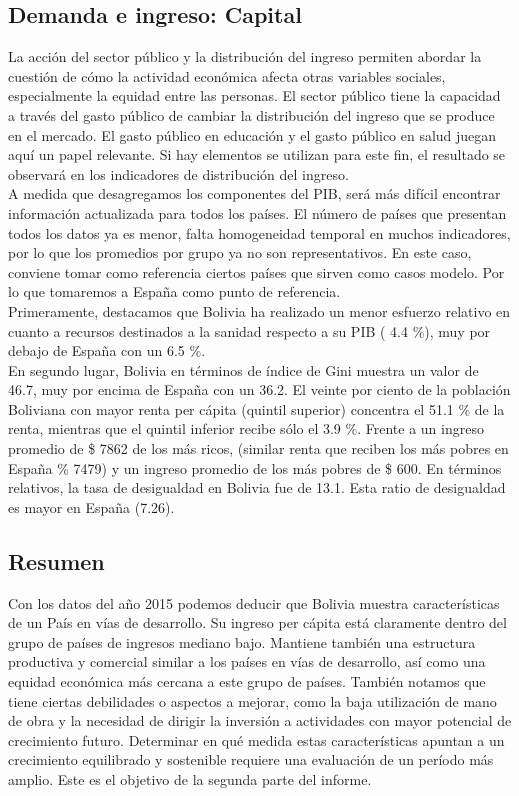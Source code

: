     \subsection{Demanda e ingreso: Capital}
    La acción del sector público y la distribución del ingreso permiten abordar la cuestión de cómo la actividad económica afecta otras variables sociales, especialmente la equidad entre las personas. El sector público tiene la capacidad a través del gasto público de cambiar la distribución del ingreso que se produce en el mercado. El gasto público en educación y el gasto público en salud juegan aquí un papel relevante. Si hay elementos se utilizan para este fin, el resultado se observará en los indicadores de distribución del ingreso.\\
    A medida que desagregamos los componentes del PIB, será más difícil encontrar información actualizada para todos los países. El número de países que presentan todos los datos ya es menor, falta homogeneidad temporal en muchos indicadores, por lo que los promedios por grupo ya no son representativos. En este caso, conviene tomar como referencia ciertos países que sirven como casos modelo. Por lo que tomaremos a España como punto de referencia.\\
    Primeramente, destacamos que Bolivia ha realizado un menor esfuerzo relativo en cuanto a recursos destinados a la sanidad respecto a su PIB ( 4.4 \%), muy por debajo de España con un 6.5 \%.\\
    En segundo lugar, Bolivia en términos de índice de Gini muestra un valor de 46.7, muy por encima de  España con un 36.2. El veinte por ciento de la población Boliviana con mayor renta per cápita (quintil superior) concentra el 51.1 \% de la renta, mientras que el quintil inferior recibe sólo el 3.9 \%. Frente a un ingreso promedio de \$ 7862 de los más ricos, (similar renta que reciben los más pobres en España \% 7479) y un ingreso promedio de los más pobres de \$ 600. En términos relativos, la tasa de desigualdad en Bolivia fue de 13.1. Esta ratio de desigualdad es mayor en  España (7.26). 
    
    \subsection{Resumen}
    Con los datos del año 2015 podemos deducir que Bolivia muestra características de un País en vías de desarrollo. Su ingreso per cápita está claramente dentro del grupo de países de ingresos mediano bajo. Mantiene también una estructura productiva y comercial similar a los países en vías de desarrollo, así como una equidad económica más cercana a este grupo de países. También notamos que tiene ciertas debilidades o aspectos a mejorar, como la baja utilización de mano de obra y la necesidad de dirigir la inversión a actividades con mayor potencial de crecimiento futuro. Determinar en qué medida estas características apuntan a un crecimiento equilibrado y sostenible requiere una evaluación de un período más amplio. Este es el objetivo de la segunda parte del informe.

